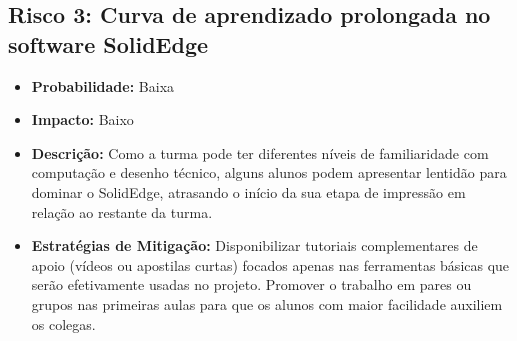 \documentclass[12pt, a4paper]{article}
\begin{document}
\subsection{Risco 3: Curva de aprendizado prolongada no software SolidEdge}
\begin{itemize}
    \item \textbf{Probabilidade:} Baixa
    \item \textbf{Impacto:} Baixo
    \item \textbf{Descrição:} Como a turma pode ter diferentes níveis de familiaridade com computação e desenho técnico, alguns alunos podem apresentar lentidão para dominar o SolidEdge, atrasando o início da sua etapa de impressão em relação ao restante da turma.
    \item \textbf{Estratégias de Mitigação:} Disponibilizar tutoriais complementares de apoio (vídeos ou apostilas curtas) focados apenas nas ferramentas básicas que serão efetivamente usadas no projeto. Promover o trabalho em pares ou grupos nas primeiras aulas para que os alunos com maior facilidade auxiliem os colegas.
\end{itemize}
\end{document}
